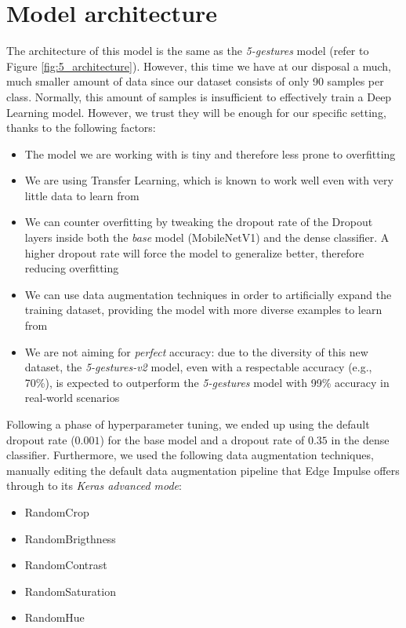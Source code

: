 \documentclass{Configuration_Files/PoliMi3i_thesis}
\begin{document}
\section{Model architecture}
\label{sec:5-v2-arch}
The architecture of this model is the same as the \textit{5-gestures} model (refer to Figure \ref{fig:5_architecture}). However, this time we have at our disposal a much, much smaller amount of data since our dataset consists of only 90 samples per class. Normally, this amount of samples is insufficient to effectively train a Deep Learning model. However, we trust they will be enough for our specific setting, thanks to the following factors:
\begin{itemize}
    \item The model we are working with is tiny and therefore less prone to overfitting
    \item We are using Transfer Learning, which is known to work well even with very little data to learn from
    \item We can counter overfitting by tweaking the dropout rate of the Dropout layers inside both the \textit{base} model (MobileNetV1) and the dense classifier. A higher dropout rate will force the model to generalize better, therefore reducing overfitting
    \item We can use data augmentation techniques in order to artificially expand the training dataset, providing the model with more diverse examples to learn from
    \item We are not aiming for \textit{perfect} accuracy: due to the diversity of this new dataset, the \textit{5-gestures-v2} model, even with a respectable accuracy (e.g., 70\%), is expected to outperform the \textit{5-gestures} model with 99\% accuracy in real-world scenarios
\end{itemize}

Following a phase of hyperparameter tuning, we ended up using the default dropout rate ($0.001$) for the base model and a dropout rate of $0.35$ in the dense classifier. Furthermore, we used the following data augmentation techniques, manually editing the default data augmentation pipeline that Edge Impulse offers through to its \textit{Keras advanced mode}:
\begin{itemize}
    \item RandomCrop
    \item RandomBrigthness
    \item RandomContrast
    \item RandomSaturation
    \item RandomHue
\end{itemize}
\end{document}
